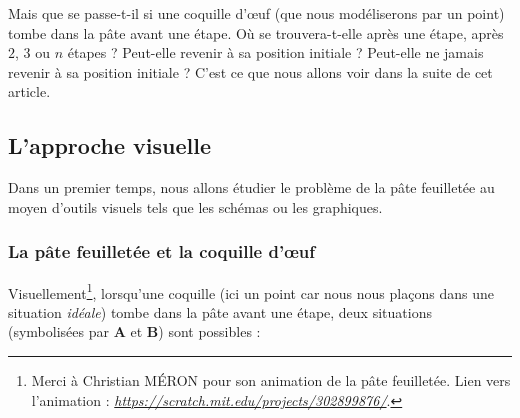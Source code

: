\documentclass[a4paper,french,12pt]{article}
\begin{document}
Mais que se passe-t-il si une coquille d'œuf (que nous modéliserons par un point) tombe dans la pâte avant une étape. Où se trouvera-t-elle après une étape, après $2$, $3$ ou $n$ étapes ? Peut-elle revenir à sa position initiale ? Peut-elle ne jamais revenir à sa position initiale ? C'est ce que nous allons voir dans la suite de cet article.


\subsection{L'approche visuelle}
Dans un premier temps, nous allons étudier le problème de la pâte feuilletée au moyen d'outils visuels tels que les schémas ou les graphiques.


\subsubsection{La pâte feuilletée et la coquille d'œuf}
Visuellement\footnote{Merci à Christian MÉRON pour son animation de la pâte feuilletée. Lien vers l'animation : \emph{\href{https://scratch.mit.edu/projects/302899876/}{https://scratch.mit.edu/projects/302899876/}}.}, lorsqu'une coquille (ici un point car nous nous plaçons dans une situation \emph{idéale}) tombe dans la pâte avant une étape, deux situations (symbolisées par \textbf{A} et \textbf{B}) sont possibles :

\vspace*{-0.25cm}
\end{document}
